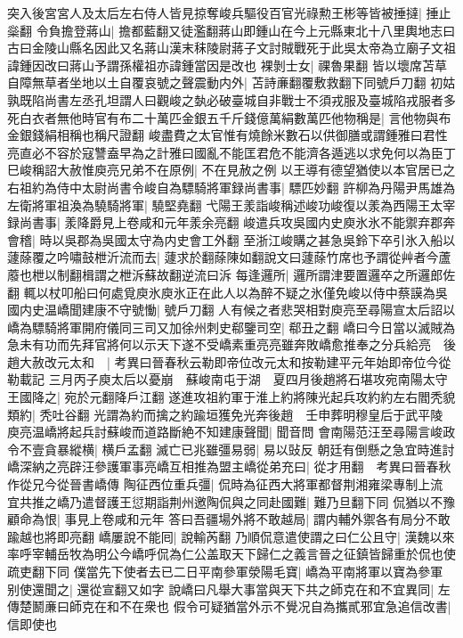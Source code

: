 突入後宮宮人及太后左右侍人皆見掠奪峻兵驅役百官光祿勲王彬等皆被捶撻|{
	捶止橤翻}
令負擔登蔣山|{
	擔都藍翻又徒濫翻蔣山即鍾山在今上元縣東北十八里輿地志曰古曰金陵山縣名因此又名蔣山漢末秣陵尉蔣子文討賊戰死于此吳太帝為立廟子文祖諱鍾因改曰蔣山予謂孫權祖亦諱鍾當因是改也}
裸剝士女|{
	祼魯果翻}
皆以壞席苫草自障無草者坐地以土自覆哀號之聲震動内外|{
	苫詩亷翻覆敷救翻下同號戶刀翻}
初姑孰既陷尚書左丞孔坦謂人曰觀峻之埶必破臺城自非戰士不須戎服及臺城陷戎服者多死白衣者無他時官有布二十萬匹金銀五千斤錢億萬絹數萬匹他物稱是|{
	言他物與布金銀錢絹相稱也稱尺證翻}
峻盡費之太官惟有燒餘米數石以供御膳或謂鍾雅曰君性亮直必不容於寇讐盍早為之計雅曰國亂不能匡君危不能濟各遁逃以求免何以為臣丁巳峻稱詔大赦惟庾亮兄弟不在原例|{
	不在見赦之例}
以王導有德望猶使以本官居已之右祖約為侍中太尉尚書令峻自為驃騎將軍録尚書事|{
	驃匹妙翻}
許柳為丹陽尹馬雄為左衛將軍祖渙為驍騎將軍|{
	驍堅堯翻}
弋陽王羕詣峻稱述峻功峻復以羕為西陽王太宰録尚書事|{
	羕降爵見上卷咸和元年羕余亮翻}
峻遣兵攻吳國内史庾氷氷不能禦弃郡奔會稽|{
	時以吳郡為吳國太守為内史會工外翻}
至浙江峻購之甚急吳鈴下卒引氷入船以蘧蒢覆之吟嘯鼓枻沂流而去|{
	蘧求於翻蒢陳如翻說文曰蘧蒢竹席也予謂從艸者今蘆䕠也枻以制翻楫謂之枻泝蘇故翻逆流曰泝}
每逢邏所|{
	邏所謂津要置邏卒之所邏郎佐翻}
輒以杖叩船曰何處覓庾氷庾氷正在此人以為醉不疑之氷僅免峻以侍中蔡謨為吳國内史温嶠聞建康不守號慟|{
	號戶刀翻}
人有候之者悲哭相對庾亮至尋陽宣太后詔以嶠為驃騎將軍開府儀同三司又加徐州刺史郗鑒司空|{
	郗丑之翻}
嶠曰今日當以滅賊為急未有功而先拜官將何以示天下遂不受嶠素重亮亮雖奔敗嶠愈推奉之分兵給亮　後趙大赦改元太和　|{
	考異曰晉春秋云勒即帝位改元太和按勒建平元年始即帝位今從勒載記}
三月丙子庾太后以憂崩　蘇峻南屯于湖　夏四月後趙將石堪攻宛南陽太守王國降之|{
	宛於元翻降戶江翻}
遂進攻祖約軍于淮上約將陳光起兵攻約約左右閻秃貌類約|{
	秃吐谷翻}
光謂為約而擒之約踰垣獲免光奔後趙　壬申葬明穆皇后于武平陵　庾亮温嶠將起兵討蘇峻而道路斷絶不知建康聲聞|{
	聞音問}
會南陽范汪至尋陽言峻政令不壹貪暴縱横|{
	横戶孟翻}
滅亡已兆雖彊易弱|{
	易以䜴反}
朝廷有倒懸之急宜時進討嶠深納之亮辟汪參護軍事亮嶠互相推為盟主嶠從弟充曰|{
	從才用翻　考異曰晉春秋作從兄今從晉書嶠傳}
陶征西位重兵彊|{
	侃時為征西大將軍都督荆湘雍梁專制上流}
宜共推之嶠乃遣督護王愆期詣荆州邀陶侃與之同赴國難|{
	難乃旦翻下同}
侃猶以不豫顧命為恨|{
	事見上卷咸和元年}
答曰吾疆場外將不敢越局|{
	謂内輔外禦各有局分不敢踰越也將即亮翻}
嶠屢說不能囘|{
	說輸芮翻}
乃順侃意遣使謂之曰仁公且守|{
	漢魏以來率呼宰輔岳牧為明公今嶠呼侃為仁公盖取天下歸仁之義言晉之征鎮皆歸重於侃也使疏吏翻下同}
僕當先下使者去已二日平南參軍滎陽毛寶|{
	嶠為平南將軍以寶為參軍}
别使還聞之|{
	還從宣翻又如字}
說嶠曰凡舉大事當與天下共之師克在和不宜異同|{
	左傳楚鬭亷曰師克在和不在衆也}
假令可疑猶當外示不覺况自為攜貳邪宜急追信改書|{
	信即使也}
